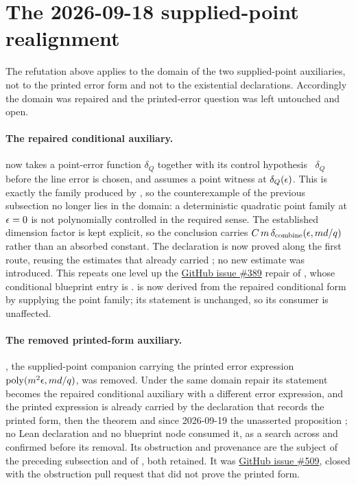 \documentclass[11pt]{article}
\DeclareMathOperator{\poly}{poly}
\renewcommand{\ghissue}[1]{%
  \href{https://github.com/Dengnifer/MIPStarRE-QPBT/issues/#1}{GitHub issue \##1}}
\begin{document}
\section{The 2026-09-18 supplied-point realignment}
\label{sec:supplied-point-realignment}

The refutation above applies to the domain of the two supplied-point
auxiliaries, not to the printed error form and not to the existential
declarations. Accordingly the domain was repaired and the printed-error
question was left untouched and open.

\paragraph{The repaired conditional auxiliary.}
 now takes a
point-error function $\delta_Q$ together with its control hypothesis
~$\delta_Q$ before the line error is chosen, and assumes a
point witness at $\delta_Q(\epsilon)$. This is exactly the family produced by
, so the counterexample of the previous
subsection no longer lies in the domain: a deterministic quadratic point family
at $\epsilon=0$ is not polynomially controlled in the required sense. The
established dimension factor is kept explicit, so the conclusion carries
$C\,m\,\delta_{\mathrm{combine}}(\epsilon,md/q)$ rather than an absorbed constant.
The declaration is now proved along the first route, reusing the estimates that
already carried ; no new estimate
was introduced. This repeats one level up the \ghissue{389} repair of
, whose conditional blueprint
entry is .
 is now derived from the repaired
conditional form by supplying the point family; its statement is unchanged, so
its consumer  is unaffected.

\paragraph{The removed printed-form auxiliary.}
, the supplied-point companion
carrying the printed error expression $\poly(m^2\eps,md/q)$, was removed. Under
the same domain repair its statement becomes the repaired conditional auxiliary
with a different error expression, and the printed expression is already carried
by the declaration that records the printed form, then the theorem
 and since 2026-09-19 the unasserted
proposition ; no Lean
declaration and no blueprint node consumed it, as a search across
 and  confirmed before its removal. Its
obstruction and provenance are the subject of the preceding subsection and of
, both retained.
It was \ghissue{509}, closed with the obstruction pull request that did not
prove the printed form.
\end{document}
